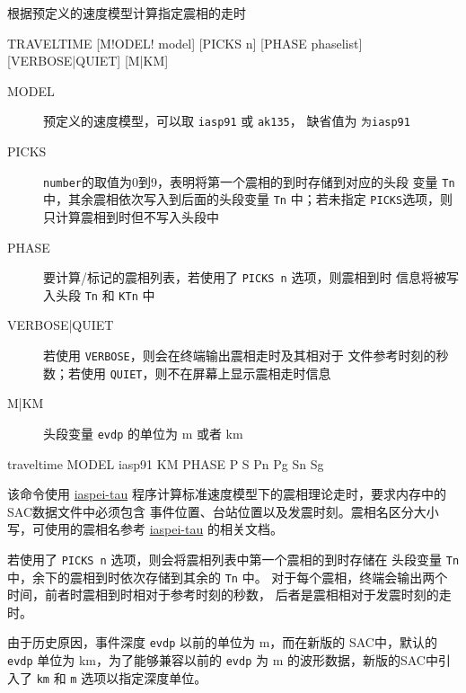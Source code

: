 \label{cmd:traveltime}

根据预定义的速度模型计算指定震相的走时

\begin{SACSTX}
TRAVELTIME [M!ODEL! model] [PICKS n] [PHASE phaselist] [VERBOSE|QUIET] [M|KM]
\end{SACSTX}

\begin{description}
\item [MODEL] 预定义的速度模型，可以取 \texttt{iasp91} 或 \texttt{ak135}，
    缺省值为 \texttt{为iasp91}
\item [PICKS] \texttt{number}的取值为0到9，表明将第一个震相的到时存储到对应的头段
    变量 \texttt{Tn} 中，其余震相依次写入到后面的头段变量 \texttt{Tn} 中；若未指定
    \texttt{PICKS}选项，则只计算震相到时但不写入头段中
\item [PHASE] 要计算/标记的震相列表，若使用了 \texttt{PICKS n} 选项，则震相到时
    信息将被写入头段 \texttt{Tn} 和 \texttt{KTn} 中
\item [VERBOSE|QUIET] 若使用 \texttt{VERBOSE}，则会在终端输出震相走时及其相对于
    文件参考时刻的秒数；若使用 \texttt{QUIET}，则不在屏幕上显示震相走时信息
\item [M|KM] 头段变量 \texttt{evdp} 的单位为 \si{\m} 或者 \si{\km}
\end{description}

\begin{SACDFT}
traveltime MODEL iasp91 KM PHASE P S Pn Pg Sn Sg
\end{SACDFT}

该命令使用 \href{https://seiscode.iris.washington.edu/projects/iaspei-tau}{iaspei-tau}
程序计算标准速度模型下的震相理论走时，要求内存中的SAC数据文件中必须包含
事件位置、台站位置以及发震时刻。震相名区分大小写，可使用的震相名参考
\href{https://seiscode.iris.washington.edu/projects/iaspei-tau}{iaspei-tau}
的相关文档。

若使用了 \texttt{PICKS n} 选项，则会将震相列表中第一个震相的到时存储在
头段变量 \texttt{Tn} 中，余下的震相到时依次存储到其余的 \texttt{Tn} 中。
对于每个震相，终端会输出两个时间，前者时震相到时相对于参考时刻的秒数，
后者是震相相对于发震时刻的走时。

由于历史原因，事件深度 \texttt{evdp} 以前的单位为 \si{\m}，而在新版的
SAC中，默认的 \texttt{evdp} 单位为 \si{\km}，为了能够兼容以前的
\texttt{evdp} 为 \si{\m} 的波形数据，新版的SAC中引入了 \texttt{km} 和
\texttt{m} 选项以指定深度单位。

